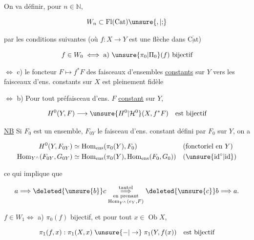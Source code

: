 On va définir, pour $n\in\mathbb N$,

\[
 W_n\subset\operatorname{Fl}(\mathrm{Cat})\unsure{,|{;}}
\]

par les conditions suivantes (où $f:X\to Y$ est une flèche dans $\underline{\overline{\mathrm{Cat}}}$)

\[
 f\in W_0\iff\text{a) }\unsure{\pi_0|\Pi_0}(f)\ \text{bijectif}
\]

   
$\Longleftrightarrow$ c) le foncteur $F\mapsto f^*F$ des faisceaux d'ensembles \uline{constants} sur $Y$ vers les faisceaux d'ens. constants sur $X$ est pleinement fidèle


$\Longleftrightarrow$ b) Pour tout préfaisceau d'ens. $F$ \uline{constant} sur $Y$,

\[
 H^0(Y,F)\longrightarrow \unsure{H^0|\mathcal H^0}(X,f^*F)\quad\text{est bijectif}
\]

\uline{NB} Si $F_0$ est un ensemble, $F_{0Y}$ le faisceau d'ens. constant défini par $F_0$ sur $Y$, on a

\[
\begin{aligned}
 H^0(Y,F_{0Y})&\simeq\operatorname{Hom}_{\mathrm{ens}}(\pi_0(Y),F_0)
    &&(\text{fonctoriel en }Y)\\
 \operatorname{Hom}_{Y^\wedge}(F_{0Y},G_{0Y})&\simeq
 \operatorname{Hom}_{\mathrm{ens}}(\pi_0(Y),\operatorname{Hom}_{\mathrm{ens}}(F_0,G_0))
    &&(\unsure{\text{id}^{\circ}|\text{id}})
\end{aligned}
\]

ce qui implique que

\[
 a\Longrightarrow \deleted{\unsure{b}}c
\underset{\substack{\text{en prenant}\\\operatorname{Hom}_{Y^\wedge}(e_Y,F)}}{\overset{\text{tautol}}{\Longrightarrow}}
\deleted{\unsure{c}}b\Longrightarrow a.
\]

$f\in W_1\Longleftrightarrow$ a) $\pi_0(f)$ bijectif, et pour tout $x\in\operatorname{Ob}X$,

\[
 \pi_1(f,x):\pi_1(X,x)\mathrel{\unsure{-|\to}}\pi_1(Y,f(x))\quad\text{est bijectif}
\]

